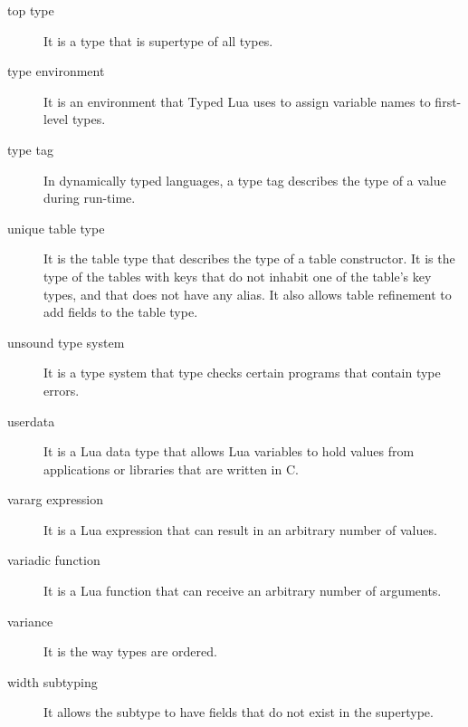 \begin{description}
\item[top type] It is a type that is supertype of all types.

\item[type environment] It is an environment that Typed Lua uses to assign variable names to first-level types.

\item[type tag] In dynamically typed languages, a type tag describes the type of a value during run-time.

\item[unique table type] It is the table type that describes the type of a table constructor.
It is the type of the tables with keys that do not inhabit one of
the table's key types, and that does not have any alias.
It also allows table refinement to add fields to the table type. 

\item[unsound type system] It is a type system that type checks certain programs that contain type errors.

\item[userdata] It is a Lua data type that allows Lua variables to hold values from applications
or libraries that are written in C.

\item[vararg expression] It is a Lua expression that can result in an arbitrary number of values.

\item[variadic function] It is a Lua function that can receive an arbitrary number of arguments.

\item[variance] It is the way types are ordered.

\item[width subtyping] It allows the subtype to have fields that do not exist in the supertype.

\end{description}
